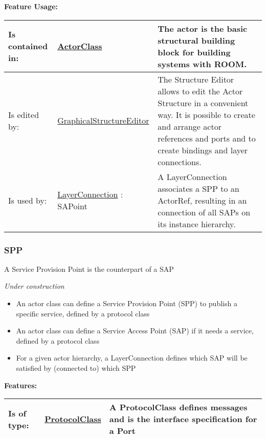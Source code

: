 		\begingroup
		\textbf{Feature Usage:}
		\renewcommand{\arraystretch}{1.8} %
		\begin{longtable}{l|l p{}}
			\hline
		Is contained in: & \tabitem \hyperlink{ref:ActorClass}{ActorClass}  & The actor is the basic structural building block for building systems with ROOM.\\
		\hline
		Is edited by: & \tabitem \hyperlink{ref:GraphicalStructureEditor}{GraphicalStructureEditor}  & The Structure Editor allows to edit the Actor Structure in a convenient way. It is possible to create and arrange actor references and ports and to create bindings and layer connections.\\
		\hline
		Is used by: & \tabitem \hyperlink{ref:LayerConnection}{LayerConnection} : SAPoint & A LayerConnection associates a SPP to an ActorRef, resulting in an connection of all SAPs on its instance hierarchy.\\
		\hline
		\end{longtable}
		\endgroup
		
		
	\vspace{\baselineskip}
	\vspace{\baselineskip}
	\vspace{\baselineskip}
	
	\subsubsection{SPP}
		\hypertarget{ref:SPP}{}
		
		A Service Provision Point is the counterpart of a SAP
		
		\emph{Under construction}
		\begin{itemize}
		\item An actor class can define a Service Provision Point (SPP) to publish a specific service, defined by a protocol class
		\item An actor class can define a Service Access Point (SAP) if it needs a service, defined by a protocol class
		\item For a given actor hierarchy, a LayerConnection defines which SAP will be satisfied by (connected to) which SPP
		\end{itemize}
		
		
		\begingroup
		\textbf{Features:}
		\renewcommand{\arraystretch}{1.8} %
		\begin{longtable}{l|l p{}}
			\hline
		Is of type: & \tabitem \hyperlink{ref:ProtocolClass}{ProtocolClass}  & A ProtocolClass defines messages and is the interface specification for a Port\\
		\hline
		\end{longtable}
		\endgroup
		
